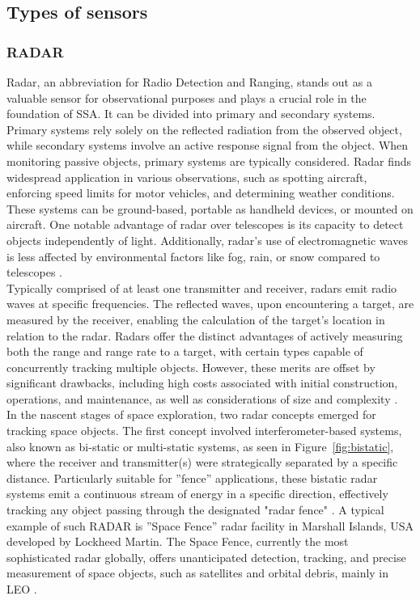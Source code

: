 \subsection{Types of sensors}

\subsubsection{RADAR}

Radar, an abbreviation for Radio Detection and Ranging, stands out as a valuable sensor for observational purposes and plays a crucial role in the foundation of SSA. It can be divided into primary and secondary systems. Primary systems rely solely on the reflected radiation from the observed object, while secondary systems involve an active response signal from the object. When monitoring passive objects, primary systems are typically considered. Radar finds widespread application in various observations, 
such as spotting aircraft, enforcing speed limits for motor vehicles, and determining weather conditions. These systems can be ground-based, portable as handheld devices, or mounted on aircraft. One notable advantage of radar over telescopes is its capacity to detect objects independently of light. Additionally, radar's use of electromagnetic waves is less 
affected by environmental factors like fog, rain, or snow compared to telescopes \cite{weeden}.\\

Typically comprised of at least one transmitter and receiver, radars emit radio waves at specific frequencies. The reflected waves, upon encountering a target, are measured by the receiver, enabling the calculation of the target's location in relation to the radar. Radars offer the distinct advantages of actively measuring both the range and range rate to a target, with certain types capable of concurrently tracking multiple objects. However, these merits are offset by significant drawbacks, including high costs associated with initial construction, operations, and maintenance, as well as considerations of size and complexity \cite{weeden}.\\

In the nascent stages of space exploration, two radar concepts emerged for tracking space objects. The first concept involved interferometer-based systems, also known as bi-static or multi-static systems, as seen in Figure~\ref{fig:bistatic}, where the receiver and transmitter(s) were strategically separated by a specific distance. Particularly suitable for ''fence'' applications, these bistatic radar systems emit a continuous stream of energy in a specific direction, effectively tracking any object passing through the designated "radar fence" \cite{bistat}. A typical example of such RADAR is ''Space Fence'' radar facility in Marshall Islands, USA developed by Lockheed Martin. The Space Fence, 
currently the most sophisticated radar globally, offers unanticipated detection, tracking, and precise measurement of space objects, such as satellites and orbital debris, mainly in LEO \cite{fence}.\\

